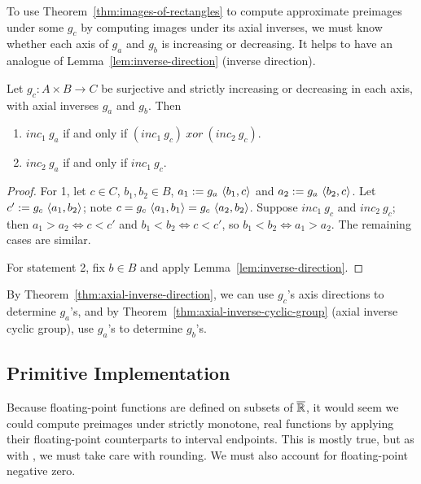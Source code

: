 To use Theorem~\ref{thm:images-of-rectangles} to compute approximate preimages under some $g_c$ by computing images under its axial inverses, we must know whether each axis of $g_a$ and $g_b$ is increasing or decreasing.
It helps to have an analogue of Lemma~\ref{lem:inverse-direction} (inverse direction).

\begin{theorem}
\label{thm:axial-inverse-direction}
Let $g_c : A \times B \to C$ be surjective and strictly increasing or decreasing in each axis, with axial inverses $g_a$ and $g_b$.
Then
\begin{enumerate}
	\item $inc_1~g_a$ if and only if $(inc_1~g_c)~xor~(inc_2~g_c)$.
	\item $inc_2~g_a$ if and only if $inc_1~g_c$.
\end{enumerate}
\end{theorem}
\begin{proof}
For 1, let $c \in C$, $b_1,b_2 \in B$, $a_1 := g_a~\langle{b_1,c}\rangle$ and $a_2 := g_a~\langle{b_2,c}\rangle$.
Let $c' := g_c~\langle{a_1,b_2}\rangle$; note $c = g_c~\langle{a_1,b_1}\rangle = g_c~\langle{a_2,b_2}\rangle$.
Suppose $inc_1~g_c$ and $inc_2~g_c$; then $a_1 > a_2 \iff c < c'$ and $b_1 < b_2 \iff c < c'$, so $b_1 < b_2 \iff a_1 > a_2$.
The remaining cases are similar.

For statement 2, fix $b \in B$ and apply Lemma~\ref{lem:inverse-direction}.
\end{proof}

By Theorem~\ref{thm:axial-inverse-direction}, we can use $g_c$'s axis directions to determine $g_a$'s, and by Theorem~\ref{thm:axial-inverse-cyclic-group} (axial inverse cyclic group), use $g_a$'s to determine $g_b$'s.



\subsection{Primitive Implementation}
\label{sec:primitive-implementation}

Because floating-point functions are defined on subsets of $\cl{\Re}$, it would seem we could compute preimages under strictly monotone, real functions by applying their floating-point counterparts to interval endpoints.
This is mostly true, but as with , we must take care with rounding.
We must also account for floating-point negative zero.

